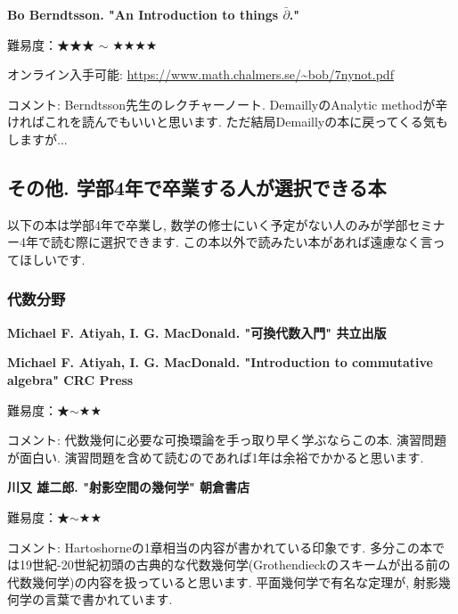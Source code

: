 \textbf{Bo Berndtsson. "An Introduction to things $\bar\partial$."}  　\vspace{-6pt} 

難易度：★★★ $\sim$ ★★★★  　\vspace{-6pt} 

オンライン入手可能: \url{https://www.math.chalmers.se/~bob/7nynot.pdf}\vspace{-6pt}

コメント: Berndtsson先生のレクチャーノート. DemaillyのAnalytic methodが辛ければこれを読んでもいいと思います. ただ結局Demaillyの本に戻ってくる気もしますが...

\subsection{その他. 学部4年で卒業する人が選択できる本}
\label{subsec-seminar-23}

以下の本は学部4年で卒業し, 数学の修士にいく予定がない人のみが学部セミナー4年で読む際に選択できます. 
この本以外で読みたい本があれば遠慮なく言ってほしいです. 

\subsubsection{代数分野}

\textbf{Michael F. Atiyah, I. G. MacDonald. "可換代数入門" 共立出版}  　\vspace{-6pt} 

\textbf{Michael F. Atiyah, I. G. MacDonald. "Introduction to commutative algebra" CRC Press}  　\vspace{-6pt} 

難易度：★$\sim$★★ 　\vspace{-6pt} 

コメント: 代数幾何に必要な可換環論を手っ取り早く学ぶならこの本. 演習問題が面白い. 
演習問題を含めて読むのであれば1年は余裕でかかると思います. 

\vspace{8pt}

\textbf{川又 雄二郎. "射影空間の幾何学" 朝倉書店}  　\vspace{-6pt} 

難易度：★$\sim$★★ 　\vspace{-6pt} 

コメント:  Hartoshorneの1章相当の内容が書かれている印象です. 多分この本では19世紀-20世紀初頭の古典的な代数幾何学(Grothendieckのスキームが出る前の代数幾何学)の内容を扱っていると思います.
平面幾何学で有名な定理が, 射影幾何学の言葉で書かれています. 

